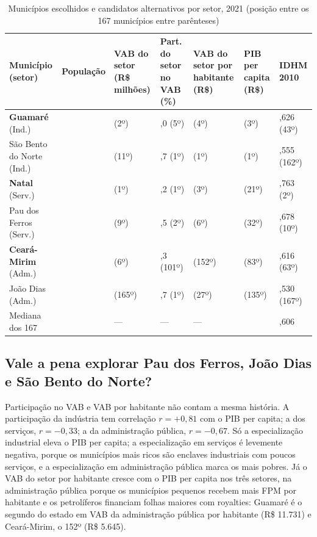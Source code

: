\documentclass[12pt,a4paper]{article}
\newcommand{\fonte}[1]{\par\vspace{2pt}{\centering\small #1\par}\vspace{2pt}}
\begin{document}
\begin{table}[!htb]
\centering
\caption{Municípios escolhidos e candidatos alternativos por setor, 2021 (posição entre os 167 municípios entre parênteses)}
\label{tab:c}
\footnotesize\setlength{\tabcolsep}{3pt}
\begin{tabular}{@{}p{3.3cm}>{\centering\arraybackslash}p{1.4cm}>{\centering\arraybackslash}p{1.9cm}>{\centering\arraybackslash}p{1.6cm}>{\centering\arraybackslash}p{2.1cm}>{\centering\arraybackslash}p{2.0cm}>{\centering\arraybackslash}p{2.0cm}@{}}
\toprule
Município (setor) & População & VAB do setor (R\$ milhões) & Part. do setor no VAB (\%) & VAB do setor por habitante (R\$) & PIB per capita (R\$) & IDHM 2010 \\
\midrule
\textbf{Guamaré} (Ind.) & 16.261 & 1.471 (2º) & 75,0 (5º) & 90.463 (4º) & 125.585 (3º) & 0,626 (43º) \\
São Bento do Norte (Ind.) & 2.687 & 452 (11º) & 88,7 (1º) & 168.285 (1º) & 204.407 (1º) & 0,555 (162º) \\
\textbf{Natal} (Serv.) & 896.708 & 13.348 (1º) & 64,2 (1º) & 14.885 (3º) & 26.972 (21º) & 0,763 (2º) \\
Pau dos Ferros (Serv.) & 30.802 & 389 (9º) & 63,5 (2º) & 12.631 (6º) & 23.029 (32º) & 0,678 (10º) \\
\textbf{Ceará-Mirim} (Adm.) & 74.268 & 419 (6º) & 46,3 (101º) & 5.645 (152º) & 13.494 (83º) & 0,616 (63º) \\
João Dias (Adm.) & 2.653 & 20 (165º) & 72,7 (1º) & 7.473 (27º) & 10.551 (135º) & 0,530 (167º) \\
\midrule
Mediana dos 167 & 8.297 & --- & --- & --- & 13.469 & 0,606 \\
\bottomrule
\end{tabular}
\fonte{Fonte: elaborada pelo autor (2026) com dados do IBGE (2023) e IBGE Cidades. Nota: em negrito, os escolhidos; VAB por habitante = VAB do setor / população de 2021.}
\end{table}

\subsection{Vale a pena explorar Pau dos Ferros, João Dias e São Bento do Norte?}

Participação no VAB e VAB por habitante não contam a mesma história. A participação da indústria tem correlação $r = +0{,}81$ com o PIB per capita; a dos serviços, $r = -0{,}33$; a da administração pública, $r = -0{,}67$. Só a especialização industrial eleva o PIB per capita; a especialização em serviços é levemente negativa, porque os municípios mais ricos são enclaves industriais com poucos serviços, e a especialização em administração pública marca os mais pobres. Já o VAB do setor por habitante cresce com o PIB per capita nos três setores, na administração pública porque os municípios pequenos recebem mais FPM por habitante e os petrolíferos financiam folhas maiores com royalties: Guamaré é o segundo do estado em VAB da administração pública por habitante (R\$ 11.731) e Ceará-Mirim, o 152º (R\$ 5.645).
\end{document}
